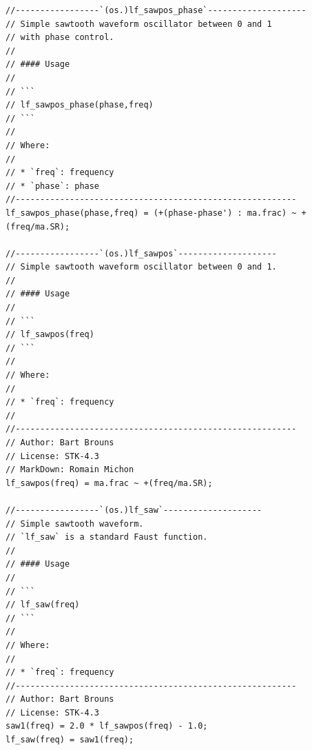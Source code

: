 \documentclass{article}
\begin{document}
\begin{lstlisting}[caption=\texttt{oscillators.lib}]
//-----------------`(os.)lf_sawpos_phase`--------------------
// Simple sawtooth waveform oscillator between 0 and 1
// with phase control.
//
// #### Usage
//
// ```
// lf_sawpos_phase(phase,freq)
// ```
//
// Where:
//
// * `freq`: frequency
// * `phase`: phase
//---------------------------------------------------------
lf_sawpos_phase(phase,freq) = (+(phase-phase') : ma.frac) ~ +(freq/ma.SR);

//-----------------`(os.)lf_sawpos`--------------------
// Simple sawtooth waveform oscillator between 0 and 1.
//
// #### Usage
//
// ```
// lf_sawpos(freq)
// ```
//
// Where:
//
// * `freq`: frequency
//
//---------------------------------------------------------
// Author: Bart Brouns
// License: STK-4.3
// MarkDown: Romain Michon
lf_sawpos(freq) = ma.frac ~ +(freq/ma.SR);

//-----------------`(os.)lf_saw`--------------------
// Simple sawtooth waveform.
// `lf_saw` is a standard Faust function.
//
// #### Usage
//
// ```
// lf_saw(freq)
// ```
//
// Where:
//
// * `freq`: frequency
//---------------------------------------------------------
// Author: Bart Brouns
// License: STK-4.3
saw1(freq) = 2.0 * lf_sawpos(freq) - 1.0;
lf_saw(freq) = saw1(freq);


\end{lstlisting}
\end{document}
